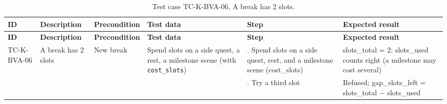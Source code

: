{\footnotesize{}\renewcommand{\arraystretch}{1.1}
\begin{longtable}{|>{\raggedright\arraybackslash}p{}|>{\raggedright\arraybackslash}p{}|>{\raggedright\arraybackslash}p{}|>{\raggedright\arraybackslash}p{}|>{\raggedright\arraybackslash}p{}|>{\raggedright\arraybackslash}p{}|}
\caption{Test case TC-\allowbreak{}K-\allowbreak{}BVA-\allowbreak{}06, A break has 2 slots.} \\
\hline
\textbf{ID} & \textbf{Description} & \textbf{Precondition} & \textbf{Test data} & \textbf{Step} & \textbf{Expected result} \\ \hline
\endfirsthead
\hline
\textbf{ID} & \textbf{Description} & \textbf{Precondition} & \textbf{Test data} & \textbf{Step} & \textbf{Expected result} \\ \hline
\endhead
TC-K-BVA-06 & A break has 2 slots & New break & Spend slots on a side quest, a rest, a milestone scene (with \texttt{cost\_\allowbreak{}slots}) & 1. Spend slots on a side quest, rest, and a milestone scene (cost\_\allowbreak{}slots) & slots\_total = 2; slots\_used counts right (a milestone may cost several) \\ \cline{5-6}
 &  &  &  & 2. Try a third slot & Refused; gap\_\allowbreak{}slots\_\allowbreak{}left = slots\_total $-$ slots\_used \\ \hline
\end{longtable}
}

